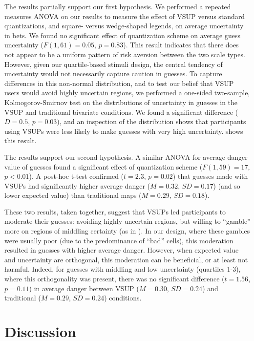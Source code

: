 The results partially support our first hypothesis. We performed a repeated measures ANOVA on our results to measure the effect of VSUP versus standard quantizations, and square- versus wedge-shaped legends, on average uncertainty in bets. We found no significant effect of quantization scheme on average guess uncertainty ($F(1,61)=0.05$, $p=0.83$). This result indicates that there does not appear to be a uniform pattern of risk aversion between the two scale types. However, given our quartile-based stimuli design, the central tendency of uncertainty would not necessarily capture caution in guesses. To capture differences in this non-normal distribution, and to test our belief that VSUP users would avoid highly uncertain regions, we performed a one-sided two-sample, Kolmogorov-Smirnov test on the distributions of uncertainty in guesses in the VSUP and traditional bivariate conditions. We found a significant difference ($D = 0.5$, $p=0.03$), and an inspection of the distribution shows that participants using VSUPs were less likely to make guesses with very high uncertainty.  shows this result.

The results support our second hypothesis. A similar ANOVA for average danger value of guesses found a significant effect of quantization scheme ($F(1,59)=17$, $p<0.01$). A post-hoc t-test confirmed ($t=2.3$, $p=0.02$) that guesses made with VSUPs had significantly higher average danger ($M=0.32$, $SD=0.17$) (and so lower expected value) than traditional maps ($M=0.29$, $SD=0.18$).

These two results, taken together, suggest that VSUPs led participants to moderate their guesses: avoiding highly uncertain regions, but willing to ``gamble'' more on regions of middling certainty (as in ). In our design, where these gambles were usually poor (due to the predominance of ``bad'' cells), this moderation resulted in guesses with higher average danger. However, when expected value and uncertainty are orthogonal, this moderation can be beneficial, or at least not harmful. Indeed, for guesses with middling and low uncertainty (quartiles 1-3), where this orthogonality was present, there was no significant difference ($t=1.56$, $p=0.11$) in average danger between VSUP ($M=0.30$, $SD=0.24$) and traditional ($M=0.29$, $SD=0.24$) conditions. 

\section{Discussion}

